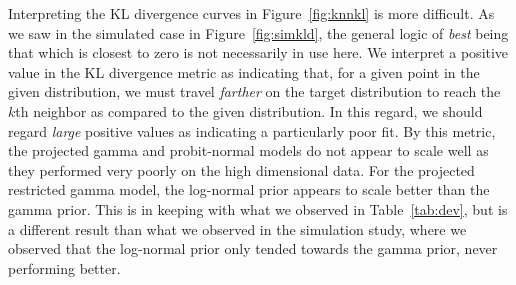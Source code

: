 Interpreting the KL divergence curves in Figure~\ref{fig:knnkl} is more difficult.  As we saw in
  the simulated case in Figure~\ref{fig:simkld}, the general logic of \emph{best} being that which
  is closest to zero is not necessarily in use here.  We interpret a positive value in the KL
  divergence metric as indicating that, for a given point in the given distribution, we must
  travel \emph{farther} on the target distribution to reach the $k$th neighbor as compared to
  the given distribution.  In this regard, we should regard \emph{large} positive values as
  indicating a particularly poor fit.  By this metric, the projected gamma and probit-normal
  models do not appear to scale well as they performed very poorly on the high dimensional data.
  For the projected restricted gamma model, the log-normal prior appears to scale better than the
  gamma prior.  This is in keeping with what we observed in Table~\ref{tab:dev}, but is a
  different result than what we observed in the simulation study, where we observed that the
  log-normal prior only tended towards the gamma prior, never performing better.

